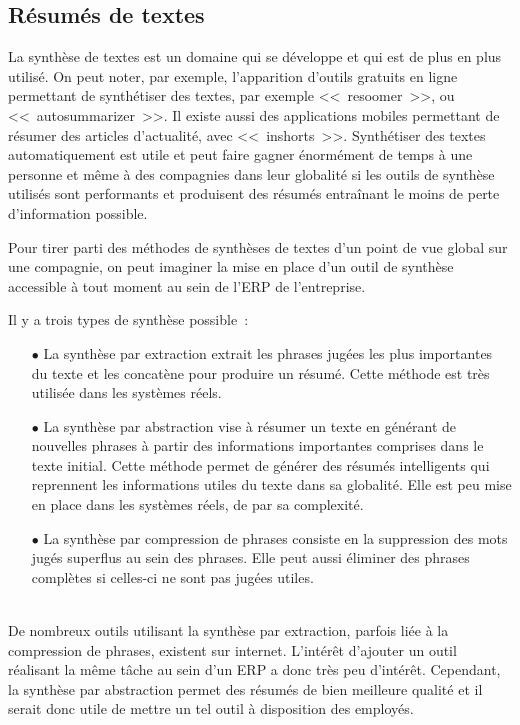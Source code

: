 \subsection{Résumés de textes}

La synthèse de textes est un domaine qui se développe et qui est de plus en plus utilisé.
On peut noter, par exemple, l'apparition d'outils gratuits en ligne permettant de synthétiser des textes, par exemple <<~resoomer~>>, ou <<~autosummarizer~>>.
Il existe aussi des applications mobiles permettant de résumer des articles d'actualité, avec <<~inshorts~>>.
Synthétiser des textes automatiquement est utile et peut faire gagner énormément de temps à une personne et même à des compagnies dans leur globalité si les outils de synthèse utilisés sont performants et produisent des résumés entraînant le moins de perte d'information possible.

Pour tirer parti des méthodes de synthèses de textes d'un point de vue global sur une compagnie, on peut imaginer la mise en place d'un outil de synthèse accessible à tout moment au sein de l'ERP de l'entreprise.

Il y a trois types de synthèse possible~:~
\\
\begin{itemize}
    \item[\tiny$\bullet$] La synthèse par extraction extrait les phrases jugées les plus importantes du texte et les concatène pour produire un résumé.
    Cette méthode est très utilisée dans les systèmes réels.
    
    \item[\tiny$\bullet$] La synthèse par abstraction vise à résumer un texte en générant de nouvelles phrases à partir des informations importantes comprises dans le texte initial.
    Cette méthode permet de générer des résumés intelligents qui reprennent les informations utiles du texte dans sa globalité.
    Elle est peu mise en place dans les systèmes réels, de par sa complexité.
    
    \item[\tiny$\bullet$] La synthèse par compression de phrases consiste en la suppression des mots jugés superflus au sein des phrases.
    Elle peut aussi éliminer des phrases complètes si celles-ci ne sont pas jugées utiles.
\end{itemize}
~\\

De nombreux outils utilisant la synthèse par extraction, parfois liée à la compression de phrases, existent sur internet.
L'intérêt d'ajouter un outil réalisant la même tâche au sein d'un ERP a donc très peu d'intérêt.
Cependant, la synthèse par abstraction permet des résumés de bien meilleure qualité et il serait donc utile de mettre un tel outil à disposition des employés.

